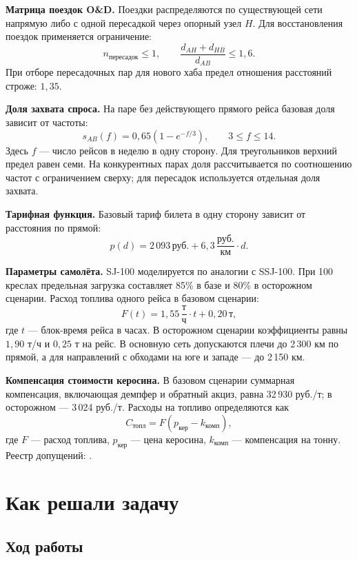 \documentclass[11pt,a4paper]{article}
\newcommand{\rub}{\text{руб.}}
\begin{document}
\textbf{Матрица поездок O\&D.}
Поездки распределяются по существующей сети напрямую либо с одной
пересадкой через опорный узел $H$. Для восстановления поездок применяется
ограничение:
\[
    n_{\text{пересадок}}\leq 1,
    \qquad
    \frac{d_{AH}+d_{HB}}{d_{AB}}\leq 1{,}6.
\]
При отборе пересадочных пар для нового хаба предел отношения расстояний
строже: $1{,}35$.

\textbf{Доля захвата спроса.}
На паре без действующего прямого рейса базовая доля зависит от частоты:
\[
    s_{AB}(f)=0{,}65\left(1-e^{-f/3}\right),
    \qquad 3\leq f\leq 14.
\]
Здесь $f$ --- число рейсов в неделю в одну сторону. Для треугольников
верхний предел равен семи. На конкурентных парах доля рассчитывается
по соотношению частот с ограничением сверху; для пересадок используется
отдельная доля захвата.

\textbf{Тарифная функция.}
Базовый тариф билета в одну сторону зависит от расстояния по прямой:
\[
    p(d)=2\,093\,\rub
    +6{,}3\,\frac{\rub}{\text{км}}\cdot d.
\]

\textbf{Параметры самолёта.}
SJ-100 моделируется по аналогии с SSJ-100. При 100 креслах предельная
загрузка составляет 85\% в базе и 80\% в осторожном сценарии.
Расход топлива одного рейса в базовом сценарии:
\[
    F(t)=1{,}55\,\frac{\text{т}}{\text{ч}}\cdot t+0{,}20\,\text{т},
\]
где $t$ --- блок-время рейса в часах. В осторожном сценарии коэффициенты
равны $1{,}90$ т/ч и $0{,}25$ т на рейс.
В основную сеть допускаются плечи до 2\,300 км по прямой,
а для направлений с обходами на юге и западе --- до 2\,150 км.

\textbf{Компенсация стоимости керосина.}
В базовом сценарии суммарная компенсация, включающая демпфер
и обратный акциз, равна 32\,930 руб./т; в осторожном --- 3\,024 руб./т.
Расходы на топливо определяются как
\[
    C_{\text{топл}}=F\left(p_{\text{кер}}-k_{\text{комп}}\right),
\]
где $F$ --- расход топлива, $p_{\text{кер}}$ --- цена керосина,
$k_{\text{комп}}$ --- компенсация на тонну.
Реестр допущений: .

\section{Как решали задачу}

\subsection*{Ход работы}
\end{document}
